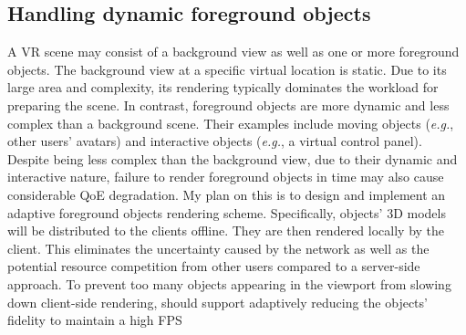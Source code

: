 \subsection{Handling dynamic foreground objects}
A VR scene may consist of a background view as well as
one or more foreground objects. The background view at
a specific virtual location is static. Due to its large area and
complexity, its rendering typically dominates the workload for
preparing the scene. In contrast, foreground objects are more
dynamic and less complex than a background scene. Their
examples include moving objects (\emph{e.g.}, other users’ avatars)
and interactive objects (\emph{e.g.}, a virtual control panel). Despite
being less complex than the background view, due to their
dynamic and interactive nature, failure to render foreground 
objects in time may also cause considerable QoE degradation. My plan on this is to design and implement an adaptive foreground objects rendering scheme. Specifically, objects’ 3D models will be distributed
to the clients offline. They are then rendered locally
by the client. This eliminates the uncertainty caused by the
network as well as the potential resource competition from
other users compared to a server-side approach. To prevent too
many objects appearing in the viewport from slowing down
client-side rendering, \firefly should support adaptively reducing the
objects’ fidelity to maintain a high FPS
